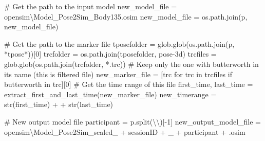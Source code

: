 \documentclass[
  letterpaper,
  DIV=11,
  numbers=noendperiod]{scrreprt}
\newenvironment{Shaded}{\begin{snugshade}}{\end{snugshade}}
\newcommand{\BuiltInTok}[1]{\textcolor[rgb]{0.00,0.23,0.31}{#1}}
\newcommand{\CharTok}[1]{\textcolor[rgb]{0.13,0.47,0.30}{#1}}
\newcommand{\CommentTok}[1]{\textcolor[rgb]{0.37,0.37,0.37}{#1}}
\newcommand{\ControlFlowTok}[1]{\textcolor[rgb]{0.00,0.23,0.31}{#1}}
\newcommand{\DecValTok}[1]{\textcolor[rgb]{0.68,0.00,0.00}{#1}}
\newcommand{\KeywordTok}[1]{\textcolor[rgb]{0.00,0.23,0.31}{#1}}
\newcommand{\NormalTok}[1]{\textcolor[rgb]{0.00,0.23,0.31}{#1}}
\newcommand{\OperatorTok}[1]{\textcolor[rgb]{0.37,0.37,0.37}{#1}}
\newcommand{\StringTok}[1]{\textcolor[rgb]{0.13,0.47,0.30}{#1}}
\begin{document}
\begin{Shaded}
\begin{Highlighting}[]
            \CommentTok{\# Get the path to the input model}
\NormalTok{            new\_model\_file }\OperatorTok{=} \StringTok{\textquotesingle{}opensim\textbackslash{}Model\_Pose2Sim\_Body135.osim\textquotesingle{}}
\NormalTok{            new\_model\_file }\OperatorTok{=}\NormalTok{ os.path.join(p, new\_model\_file)}

            \CommentTok{\# Get the path to the marker file}
\NormalTok{            tposefolder }\OperatorTok{=}\NormalTok{ glob.glob(os.path.join(p, }\StringTok{\textquotesingle{}*tpose*\textquotesingle{}}\NormalTok{))[}\DecValTok{0}\NormalTok{]}
\NormalTok{            trcfolder }\OperatorTok{=}\NormalTok{ os.path.join(tposefolder, }\StringTok{\textquotesingle{}pose{-}3d\textquotesingle{}}\NormalTok{)}
\NormalTok{            trcfiles }\OperatorTok{=}\NormalTok{ glob.glob(os.path.join(trcfolder, }\StringTok{\textquotesingle{}*.trc\textquotesingle{}}\NormalTok{))}
            \CommentTok{\# Keep only the one with \textquotesingle{}butterworth\textquotesingle{} in its name (this is filtered file)}
\NormalTok{            new\_marker\_file }\OperatorTok{=}\NormalTok{ [trc }\ControlFlowTok{for}\NormalTok{ trc }\KeywordTok{in}\NormalTok{ trcfiles }\ControlFlowTok{if} \StringTok{\textquotesingle{}butterworth\textquotesingle{}} \KeywordTok{in}\NormalTok{ trc][}\DecValTok{0}\NormalTok{]}
            \CommentTok{\# Get the time range of this file}
\NormalTok{            first\_time, last\_time }\OperatorTok{=}\NormalTok{ extract\_first\_and\_last\_time(new\_marker\_file)}
\NormalTok{            new\_timerange }\OperatorTok{=} \BuiltInTok{str}\NormalTok{(first\_time) }\OperatorTok{+} \StringTok{\textquotesingle{} \textquotesingle{}} \OperatorTok{+} \BuiltInTok{str}\NormalTok{(last\_time)}

            \CommentTok{\# New output model file}
\NormalTok{            participant }\OperatorTok{=}\NormalTok{ p.split(}\StringTok{\textquotesingle{}}\CharTok{\textbackslash{}\textbackslash{}}\StringTok{\textquotesingle{}}\NormalTok{)[}\OperatorTok{{-}}\DecValTok{1}\NormalTok{]}
\NormalTok{            new\_output\_model\_file }\OperatorTok{=} \StringTok{\textquotesingle{}opensim\textbackslash{}Model\_Pose2Sim\_scaled\_\textquotesingle{}} \OperatorTok{+}\NormalTok{ sessionID }\OperatorTok{+} \StringTok{\textquotesingle{}\_\textquotesingle{}} \OperatorTok{+}\NormalTok{ participant }\OperatorTok{+} \StringTok{\textquotesingle{}.osim\textquotesingle{}}


\end{Highlighting}
\end{Shaded}
\end{document}

